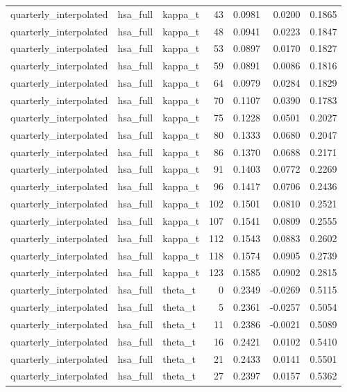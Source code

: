 \begin{tabular}{lllrrrr}
quarterly\_interpolated & hsa\_full & kappa\_t & 43 & 0.0981 & 0.0200 & 0.1865 \\
quarterly\_interpolated & hsa\_full & kappa\_t & 48 & 0.0941 & 0.0223 & 0.1847 \\
quarterly\_interpolated & hsa\_full & kappa\_t & 53 & 0.0897 & 0.0170 & 0.1827 \\
quarterly\_interpolated & hsa\_full & kappa\_t & 59 & 0.0891 & 0.0086 & 0.1816 \\
quarterly\_interpolated & hsa\_full & kappa\_t & 64 & 0.0979 & 0.0284 & 0.1829 \\
quarterly\_interpolated & hsa\_full & kappa\_t & 70 & 0.1107 & 0.0390 & 0.1783 \\
quarterly\_interpolated & hsa\_full & kappa\_t & 75 & 0.1228 & 0.0501 & 0.2027 \\
quarterly\_interpolated & hsa\_full & kappa\_t & 80 & 0.1333 & 0.0680 & 0.2047 \\
quarterly\_interpolated & hsa\_full & kappa\_t & 86 & 0.1370 & 0.0688 & 0.2171 \\
quarterly\_interpolated & hsa\_full & kappa\_t & 91 & 0.1403 & 0.0772 & 0.2269 \\
quarterly\_interpolated & hsa\_full & kappa\_t & 96 & 0.1417 & 0.0706 & 0.2436 \\
quarterly\_interpolated & hsa\_full & kappa\_t & 102 & 0.1501 & 0.0810 & 0.2521 \\
quarterly\_interpolated & hsa\_full & kappa\_t & 107 & 0.1541 & 0.0809 & 0.2555 \\
quarterly\_interpolated & hsa\_full & kappa\_t & 112 & 0.1543 & 0.0883 & 0.2602 \\
quarterly\_interpolated & hsa\_full & kappa\_t & 118 & 0.1574 & 0.0905 & 0.2739 \\
quarterly\_interpolated & hsa\_full & kappa\_t & 123 & 0.1585 & 0.0902 & 0.2815 \\
quarterly\_interpolated & hsa\_full & theta\_t & 0 & 0.2349 & -0.0269 & 0.5115 \\
quarterly\_interpolated & hsa\_full & theta\_t & 5 & 0.2361 & -0.0257 & 0.5054 \\
quarterly\_interpolated & hsa\_full & theta\_t & 11 & 0.2386 & -0.0021 & 0.5089 \\
quarterly\_interpolated & hsa\_full & theta\_t & 16 & 0.2421 & 0.0102 & 0.5410 \\
quarterly\_interpolated & hsa\_full & theta\_t & 21 & 0.2433 & 0.0141 & 0.5501 \\
quarterly\_interpolated & hsa\_full & theta\_t & 27 & 0.2397 & 0.0157 & 0.5362 \\

\end{tabular}
